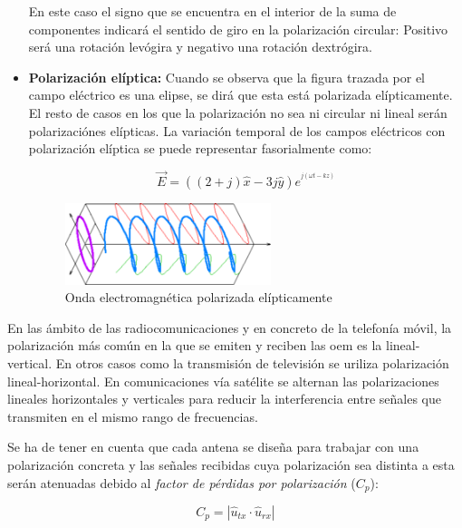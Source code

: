 \begin{itemize}
En este caso el signo que se encuentra en el interior de la suma de componentes indicará el sentido de giro en la polarización circular: Positivo será una rotación levógira y negativo una rotación dextrógira.

\item\textbf{Polarización elíptica: }Cuando se observa que la figura trazada por el campo eléctrico es una elipse, se dirá que esta está polarizada elípticamente. El resto de casos en los que la polarización no sea ni circular ni lineal serán polarizaciónes elípticas. La variación temporal de los campos eléctricos con polarización elíptica se puede representar fasorialmente como:

\begin{equation}
	\vec{E} = ((2+j)\hat{x}-3j\hat{y})e^{^{j(\omega t-kz)}}
	\label{eq:polelip}
\end{equation}
\begin{figure}[h]
    \centering
        \includegraphics[width=6cm]{archivos/polarizacion/eliptica}
        \caption{Onda electromagnética polarizada elípticamente}
        \label{fig:poleli}
\end{figure}

\end{itemize}

\par En las ámbito de las radiocomunicaciones y en concreto de la telefonía móvil, la polarización más común en la que se emiten y reciben las \gls{oem} es la lineal-vertical. En otros casos como la transmisión de televisión se uriliza polarización lineal-horizontal. En comunicaciones vía satélite se alternan las polarizaciones lineales horizontales y verticales para reducir la interferencia entre señales que transmiten en el mismo rango de frecuencias.
\\
\par Se ha de tener en cuenta que cada antena se diseña para trabajar con una polarización concreta y las señales recibidas cuya polarización sea distinta a esta serán atenuadas debido al \textit{factor de pérdidas por polarización} ($C_{p}$):

\begin{equation}
	C_{p}=\left | \hat{u}_{tx}\cdot \hat{u}_{rx} \right |
	\label{eq:polarizationlossfactor}
\end{equation}

